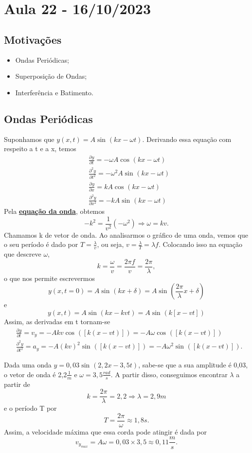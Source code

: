 \documentclass[PhysicsII/physicsII_notes.tex]{subfiles}
\begin{document}
\section{Aula 22 - 16/10/2023}
\subsection{Motivações}
\begin{itemize}
	\item Ondas Periódicas;
	\item Superposição de Ondas;
	\item Interferência e Batimento.
\end{itemize}
\subsection{Ondas Periódicas}
Suponhamos que \(y(x, t) = A\sin^{}{(kx - \omega t)}\). Derivando essa equação com respeito a t e a x, temos
\begin{align*}
	 & \frac{\partial^{}y}{\partial t^{}} = -\omega A \cos^{}{(kx-\omega t)}      \\
	 & \frac{\partial^{2}y}{\partial t^{2}} = -\omega^{2}A \sin^{}{(kx-\omega t)} \\
	 & \frac{\partial^{}y}{\partial x^{}} = k A \cos^{}{(kx-\omega t)}            \\
	 & \frac{\partial^{2}y}{\partial x^{2}} = -k A \sin^{}{(kx-\omega t)}
\end{align*}
Pela \hyperlink{wave_eqn}{\textbf{equação da onda}}, obtemos
\[
	-k^{2} = \frac{1}{v^{2}}(-\omega^{2}) \Rightarrow \omega = kv.
\]
Chamamos k de vetor de onda. Ao analisarmos o gráfico de uma onda, vemos que o seu período
é dado por \(T = \frac{\lambda }{v}\), ou seja, \(v = \frac{\lambda }{T} = \lambda f\). Colocando isso na equação que descreve \(\omega \),
\[
	k = \frac{\omega }{v} = \frac{2\pi f}{v} = \frac{2\pi }{\lambda },
\]
o que nos permite escrevermos
\[
	y(x, t=0) = A \sin^{}{(kx + \delta )} = A\sin^{}{(\frac{2\pi }{\lambda }x + \delta )}
\]
e
\[
	y(x, t) = A \sin^{}{(kx-kvt)} = A\sin^{}{(k[x-vt])}
\]
Assim, as derivadas em t tornam-se
\begin{align*}
	 & \frac{\partial^{}y}{\partial t^{}} = v_{y} = -Akv\cos^{}{([k(x-vt)])} = -A\omega \cos^{}{([k(x-vt)])}             \\
	 & \frac{\partial^{2}y}{\partial t^{2}} = a_{y} = -A(kv)^{2}\sin^{}{([k(x-vt)])} = -A\omega^{2}\sin^{}{([k(x-vt)])}.
\end{align*}
\begin{example}
	Dada uma onda \(y = 0,03\sin^{}{(2,2x - 3,5t)}\), sabe-se que a sua amplitude é 0,03, o vetor de onda é 2,2\(\frac{1}{m}\) e \(\omega = 3,5\frac{rad}{s}\). A partir disso,
	conseguimos encontrar \(\lambda \) a partir de
	\[
		k = \frac{2\pi }{\lambda } = 2,2 \Rightarrow \lambda = 2,9m
	\]
	e o período T por
	\[
		T = \frac{2\pi }{\omega }\approx 1,8s.
	\]
	Assim, a velocidade máxima que essa corda pode atingir é dada por
	\[
		v_{y_{max}} = A\omega = 0,03\times 3,5\approx 0,11\frac{m}{s}.
	\]
\end{example}
\end{document}
